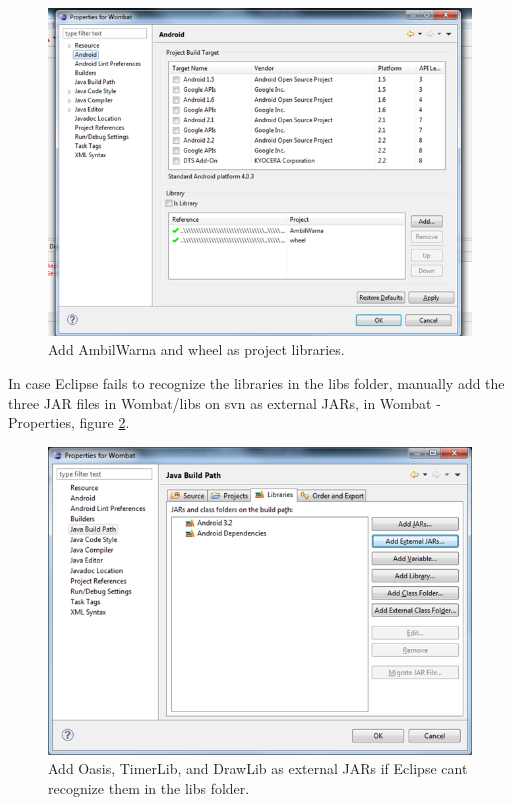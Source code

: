 \begin{figure}[H]
	\centering
		\includegraphics[scale=0.5]{Images/how_to_wombat/add_libs.png}
	\caption{Add AmbilWarna and wheel as project libraries.}
	\label{fig:add_libs}
\end{figure}

In case Eclipse fails to recognize the libraries in the libs folder, manually add the three JAR files in Wombat/libs on svn as external JARs, in Wombat - Properties, figure \ref{fig:external_jar}.

\begin{figure}[H]
	\centering
		\includegraphics[scale=0.5]{Images/how_to_wombat/external_jar.png}
	\caption{Add Oasis, TimerLib, and DrawLib as external JARs if Eclipse cant recognize them in the libs folder.}
	\label{fig:external_jar}
\end{figure}

